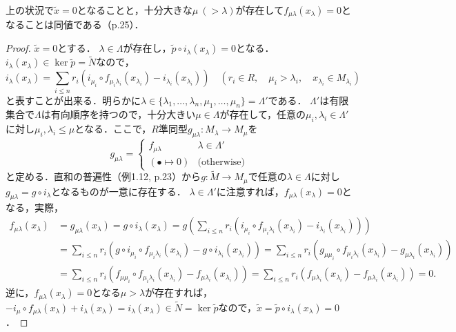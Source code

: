 \begin{screen}
  上の状況で$\tilde{x}=0$となることと，十分大きな$\mu\ (>\lambda)$が存在して$f_{\mu\lambda}(x_\lambda) = 0$となることは同値である（p.25）．
\end{screen}
\begin{proof}
  $\tilde{x}=0$とする．
  $\lambda \in \Lambda$が存在し，$\tilde{p} \circ i_\lambda (x_\lambda) = 0$となる．
  $i_\lambda (x_\lambda) \in \ker\tilde{p} = \tilde{N}$なので，
  \[ i_\lambda (x_\lambda) = \sum_{i\leq n} r_i \left( i_{\mu_i} \circ f_{\mu_i \lambda_i} (x_{\lambda_i}) - i_{\lambda_i} (x_{\lambda_i}) \right) \quad (r_i \in R,\quad \mu_i > \lambda_i,\quad x_{\lambda_i} \in M_{\lambda_i}) \]
  と表すことが出来る．明らかに$\lambda \in \{\lambda_1, \ldots, \lambda_n,\mu_1, \ldots, \mu_n\} = \Lambda'$である．
  $\Lambda'$は有限集合で$\Lambda$は有向順序を持つので，十分大きい$\mu\in\Lambda$が存在して，任意の$\mu_i, \lambda_i \in \Lambda'$に対し$\mu_i, \lambda_i \leq \mu$となる．ここで，$R$準同型$g_{\mu\lambda} \colon M_\lambda \to M_\mu$を
  \[g_{\mu\lambda}=
  \begin{cases}
    f_{\mu\lambda} & \lambda \in \Lambda'\\
    (\bullet \mapsto 0) & \text{(otherwise)}
  \end{cases}
  \]
  と定める．直和の普遍性（例1.12, p.23）から$g\colon \tilde{M} \to M_\mu$で任意の$\lambda \in \Lambda$に対し$g_{\mu\lambda} = g \circ i_\lambda$となるものが一意に存在する．
  $\lambda \in \Lambda'$に注意すれば，$f_{\mu\lambda}(x_\lambda)=0$となる，実際，
  \begin{align*}
    f_{\mu\lambda} (x_\lambda) &= g_{\mu\lambda} (x_\lambda) = g \circ i_\lambda (x_\lambda) = g \left( \sum_{i\leq n} r_i \left( i_{\mu_i} \circ f_{\mu_i \lambda_i} (x_{\lambda_i}) - i_{\lambda_i} (x_{\lambda_i}) \right) \right) \\
    &= \sum_{i\leq n} r_i \left( g \circ i_{\mu_i} \circ f_{\mu_i \lambda_i} (x_{\lambda_i}) - g \circ i_{\lambda_i} (x_{\lambda_i}) \right) = \sum_{i\leq n} r_i \left( g_{\mu\mu_i} \circ f_{\mu_i \lambda_i} (x_{\lambda_i}) - g_{\mu\lambda_i} (x_{\lambda_i}) \right) \\
    &= \sum_{i\leq n} r_i \left( f_{\mu\mu_i} \circ f_{\mu_i \lambda_i} (x_{\lambda_i}) - f_{\mu\lambda_i} (x_{\lambda_i}) \right) = \sum_{i\leq n} r_i \left( f_{\mu\lambda_i} (x_{\lambda_i}) - f_{\mu\lambda_i} (x_{\lambda_i}) \right) = 0.
  \end{align*}
  逆に，$f_{\mu\lambda} (x_\lambda) = 0$となる$\mu > \lambda$が存在すれば，$-i_\mu \circ f_{\mu\lambda} (x_\lambda) + i_\lambda (x_\lambda) = i_\lambda (x_\lambda) \in \tilde{N} = \ker\tilde{p}$なので，$\tilde{x} = \tilde{p} \circ i_\lambda (x_\lambda) = 0$．
\end{proof}

